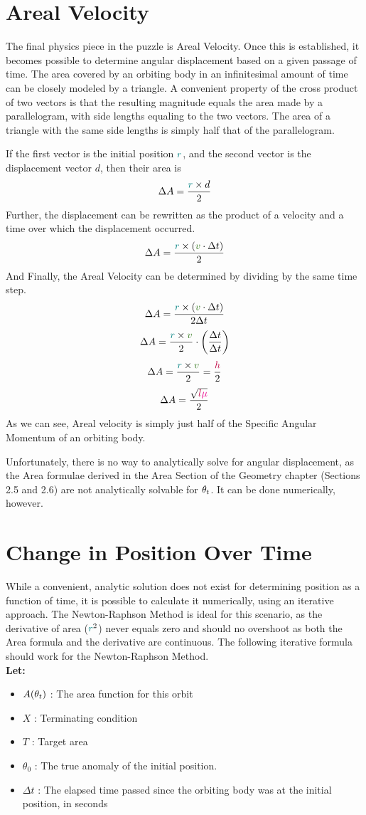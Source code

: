 \section{Areal Velocity}
The final physics piece in the puzzle is Areal Velocity. Once this is established, it becomes possible to determine angular displacement based on a given passage of time. The area covered by an orbiting body in an infinitesimal amount of time can be closely modeled by a triangle. A convenient property of the cross product of two vectors is that the resulting magnitude equals the area made by a parallelogram, with side lengths equaling to the two vectors. The area of a triangle with the same side lengths is simply half that of the parallelogram.

If the first vector is the initial position $\textcolor{teal}{r}$, and the second vector is the displacement vector $d$, then their area is $$\Delta A=\frac{\textcolor{teal}{r} \times d}{2}$$ 
Further, the displacement can be rewritten as the product of a velocity and a time over which the displacement occurred.
$$\Delta A=\frac{\rad \times \left(\vel\cdot\Delta t\right)}{2}$$
And Finally, the Areal Velocity can be determined by dividing by the same time step.
$$\Delta A=\frac{\rad \times \left(\vel\cdot\Delta t\right)}{2\Delta t}$$
$$\Delta A=\frac{\rad \times \vel}{2}\cdot\left(\frac{\Delta t}{\Delta t}\right)$$
$$\Delta A=\frac{\rad \times \vel}{2}=\frac{\hv}{2}$$ 
$$\Delta A=\frac{\sqrt{\textcolor{purple}{l}\textcolor{magenta}{\mu}}}{2}$$
As we can see, Areal velocity is simply just half of the Specific Angular Momentum of an orbiting body.

Unfortunately, there is no way to analytically solve for angular displacement, as the Area formulae derived in the Area Section of the Geometry chapter (Sections 2.5 and 2.6) are not analytically solvable for $\textcolor{black}{\theta_t}$. It can be done numerically, however.
\newpage
\section{Change in Position Over Time}
While a convenient, analytic solution does not exist for determining position as a function of time, it is possible to calculate it numerically, using an iterative approach. The Newton-Raphson Method is ideal for this scenario, as the derivative of area ($\textcolor{teal}{r}^2$) never equals zero and should no overshoot as both the Area formula and the derivative are continuous. The following iterative formula should work for the Newton-Raphson Method.
\\
\textbf{Let:}
\begin{itemize}
\item $A(\textcolor{black}{\theta_t})$ : The area function for this orbit
\item $X$ : Terminating condition
\item $T$ : Target area
\item $\theta_0$ : The true anomaly of the initial position.
\item $\Delta t$ : The elapsed time passed since the orbiting body was at the initial position, in seconds
\end{itemize}
 
